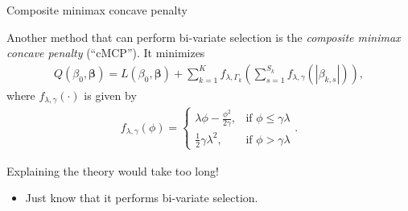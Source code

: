 \documentclass[8pt]{beamer}
\newcommand{\mys}{\vspace{0.5cm} \pause
}
\begin{document}
\begin{frame}{Composite minimax concave penalty}

Another method that can perform bi-variate selection is the \textit{composite minimax concave penalty} (``cMCP''). It minimizes
\begin{align}
    \label{cMCP}
    Q(\beta_0, \bm{\beta}) = L(\beta_0, \bm{\beta}) + \sum_{k=1}^K f_{\lambda, \Gamma_k} \left( \sum_{s=1}^{S_k} f_{\lambda, \gamma}(|\beta_{k,s}|) \right),
\end{align}
where $f_{\lambda, \gamma}(\cdot)$ is given by
\begin{align}
    \label{MCPpenalty}
    f_{\lambda, \gamma}(\phi) = \begin{cases}
        \lambda \phi - \frac{\phi^2}{2 \gamma}, & \text{if } \phi \le \gamma \lambda \\
        \frac{1}{2} \gamma \lambda^2, & \text{if } \phi > \gamma \lambda
    \end{cases}.
\end{align} \mys

Explaining the theory would take too long! \Sadey[1.5][yellow]
\begin{itemize}
    \item Just know that it performs bi-variate selection.
\end{itemize}
    
\end{frame}
\end{document}
